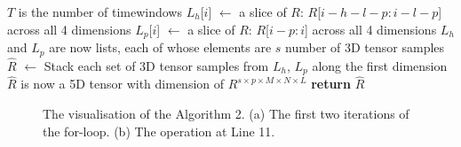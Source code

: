 \documentclass[11pt]{uonthesis}
\begin{document}
\begin{appendices}
\begin{algorithm}
\begin{algorithmic}[1]
         \Comment $T$ is the number of timewindows
            \State $L_h$[$i$] $\gets$ a slice of $R$: $R$[$i-h-l-p:i-l-p$] across all 4 dimensions
            \State $L_p$[$i$] $\gets$ a slice of $R$: $R$[$i-p:i$] across all 4 dimensions
        \EndFor \Comment $L_h$ and $L_p$ are now lists, each of whose elements are $s$ number of 3D tensor samples
        \State $\hat{R}$ $\gets$ Stack each set of 3D tensor samples from $L_h$, $L_p$ along the first dimension \Comment $\hat{R}$ is now a 5D tensor with dimension of $R^{s{\times}p{\times}M{\times}N{\times}L}$
        \State \textbf{return} $\hat{R}$
        \EndProcedure
    \end{algorithmic}
\end{algorithm}

\begin{figure}[ht!]
    \centering
\caption{The visualisation of the Algorithm 2. (a) The first two iterations of the for-loop. (b) The operation at Line 11.}
\label{fig:alg2}
\end{figure}
    
\end{appendices}
\end{document}
